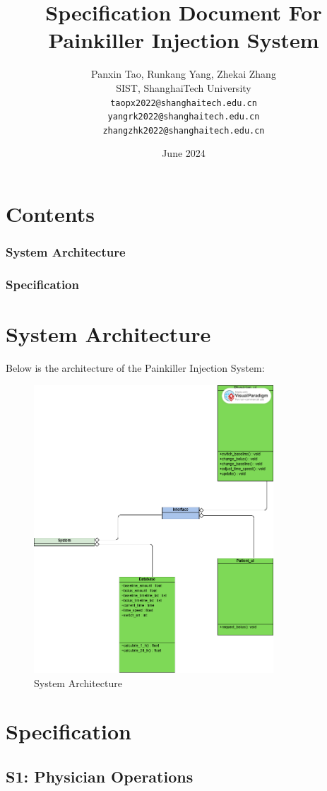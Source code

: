 \documentclass{article}
\title{\heiti Specification Document For Painkiller Injection System}
\author{%
  Panxin Tao, Runkang Yang, Zhekai Zhang\\
  SIST, ShanghaiTech University\\
  \texttt{taopx2022@shanghaitech.edu.cn}\\
  \texttt{yangrk2022@shanghaitech.edu.cn}\\
  \texttt{zhangzhk2022@shanghaitech.edu.cn}\\
}
\date{June 2024}
\begin{document}
\maketitle
\newpage
\section{Contents}
\subsubsection{System Architecture}
\subsubsection{Specification}
\newpage
\section{System Architecture}
Below is the architecture of the Painkiller Injection System:
\begin{figure}[htbp]
  \centering
  \includegraphics[width=0.8\textwidth]{img/System.png}
  \caption{System Architecture}
\end{figure}
\newpage
\section{Specification}
\subsection*{S1: Physician Operations}
\end{document}
